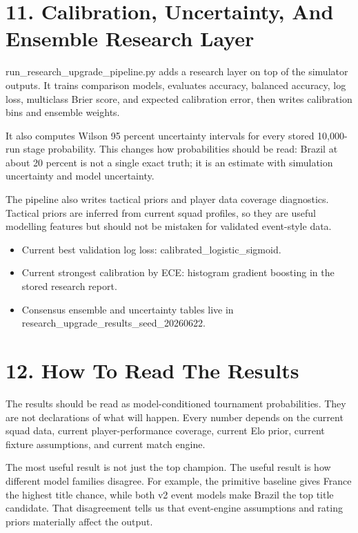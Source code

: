\documentclass[10pt]{article}
\begin{document}
\section{11. Calibration, Uncertainty, And Ensemble Research Layer}

run\_research\_upgrade\_pipeline.py adds a research layer on top of the simulator outputs. It trains comparison models, evaluates accuracy, balanced accuracy, log loss, multiclass Brier score, and expected calibration error, then writes calibration bins and ensemble weights.

It also computes Wilson 95 percent uncertainty intervals for every stored 10,000-run stage probability. This changes how probabilities should be read: Brazil at about 20 percent is not a single exact truth; it is an estimate with simulation uncertainty and model uncertainty.

The pipeline also writes tactical priors and player data coverage diagnostics. Tactical priors are inferred from current squad profiles, so they are useful modelling features but should not be mistaken for validated event-style data.

\begin{itemize}
  \item Current best validation log loss: calibrated\_logistic\_sigmoid.
  \item Current strongest calibration by ECE: histogram gradient boosting in the stored research report.
  \item Consensus ensemble and uncertainty tables live in research\_upgrade\_results\_seed\_20260622.
\end{itemize}

\section{12. How To Read The Results}

The results should be read as model-conditioned tournament probabilities. They are not declarations of what will happen. Every number depends on the current squad data, current player-performance coverage, current Elo prior, current fixture assumptions, and current match engine.

The most useful result is not just the top champion. The useful result is how different model families disagree. For example, the primitive baseline gives France the highest title chance, while both v2 event models make Brazil the top title candidate. That disagreement tells us that event-engine assumptions and rating priors materially affect the output.
\end{document}
